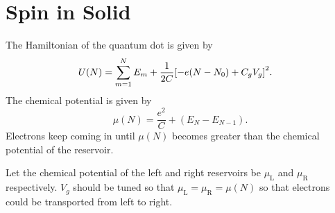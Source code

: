 \documentclass{article}
\begin{document}
\section{Spin in Solid}

The Hamiltonian of the quantum dot is given by
\begin{align*}
    U(N) &= \sum_{m=1}^N E_m + \frac{1}{2C}\qty[-e(N-N_0) + C_g V_g]^2.
\end{align*}
The chemical potential is given by
\[ \mu(N) = \frac{e^2}{C} + (E_N - E_{N-1}). \]
Electrons keep coming in until $\mu(N)$ becomes greater than the chemical potential of the reservoir.
\par
Let the chemical potential of the left and right reservoirs be $\mu_{\mathrm{L}}$ and $\mu_{\mathrm{R}}$ respectively.
$V_g$ should be tuned so that $\mu_{\mathrm{L}} = \mu_{\mathrm{R}} = \mu(N)$ so that electrons could be transported from left to right.

% 
% 
\end{document}
